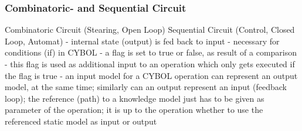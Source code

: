 %
%
%
%
%
%
%

\subsubsection{Combinatoric- and Sequential Circuit}
\label{combinatoric_and_sequential_circuit_heading}

\cite{wuttke}
Combinatoric Circuit (Stearing, Open Loop)
Sequential Circuit (Control, Closed Loop, Automat)
- internal state (output) is fed back to input
- necessary for conditions (if) in CYBOL
- a flag is set to true or false, as result of a comparison
- this flag is used as additional input to an operation which
only gets executed if the flag is true
- an input model for a CYBOL operation can represent an output model, at the same time;
similarly can an output represent an input (feedback loop);
the reference (path) to a knowledge model just has to be given as parameter of the operation;
it is up to the operation whether to use the referenced static model as input or output
